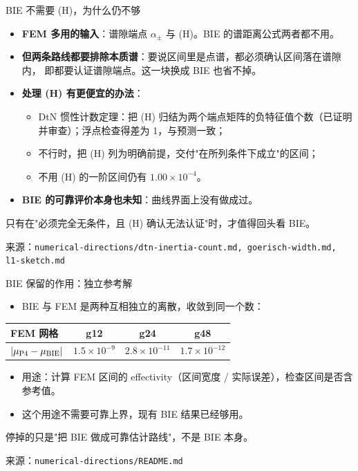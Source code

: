 \documentclass[aspectratio=169,11pt,fontset=fandol]{ctexbeamer}
\newcommand{\key}[1]{\begin{keybox}#1\end{keybox}}
\newcommand{\src}[1]{{\scriptsize\color{muted}来源：\texttt{#1}}}
\begin{document}
\begin{frame}{BIE 不需要 (H)，为什么仍不够}
  \begin{itemize}
    \item \textbf{FEM 多用的输入}：谱隙端点 $\alpha_\pm$ 与 (H)。BIE 的谱距离公式两者都不用。
    \item \textbf{但两条路线都要排除本质谱}：要说区间里是\alert{点谱}，都必须确认区间落在谱隙内，
      即都要认证谱隙端点。这一块换成 BIE 也省不掉。
    \item \textbf{处理 (H) 有更便宜的办法}：
      \begin{itemize}
        \item DtN 惯性计数定理：把 (H) 归结为两个端点矩阵的负特征值个数（已证明并审查）；浮点检查得差为 1，与预测一致；
        \item 不行时，把 (H) 列为明确前提，交付"在所列条件下成立"的区间；
        \item 不用 (H) 的一阶区间仍有 $1.00\times10^{-4}$。
      \end{itemize}
    \item \textbf{BIE 的可靠评价本身也未知}：曲线界面上没有做成过。
  \end{itemize}
  \key{只有在"必须完全无条件，且 (H) 确认无法认证"时，才值得回头看 BIE。}
  \src{numerical-directions/dtn-inertia-count.md, goerisch-width.md, l1-sketch.md}
\end{frame}

\begin{frame}{BIE 保留的作用：独立参考解}
  \begin{itemize}
    \item BIE 与 FEM 是两种互相独立的离散，收敛到同一个数：
  \end{itemize}
  \centering
  \begin{tabular}{lccc}
    \toprule
    FEM 网格 & g12 & g24 & g48 \\
    \midrule
    $|\mu_{\rm P4}-\mu_{\rm BIE}|$ & $1.5\times10^{-9}$ & $2.8\times10^{-11}$ & $1.7\times10^{-12}$ \\
    \bottomrule
  \end{tabular}
  \vspace{0.6em}
  \raggedright
  \begin{itemize}
    \item 用途：计算 FEM 区间的 effectivity（区间宽度 / 实际误差），检查区间是否含参考值。
    \item 这个用途\alert{不需要}可靠上界，现有 BIE 结果已经够用。
  \end{itemize}
  \key{停掉的只是"把 BIE 做成可靠估计路线"，不是 BIE 本身。}
  \src{numerical-directions/README.md}
\end{frame}
\end{document}
